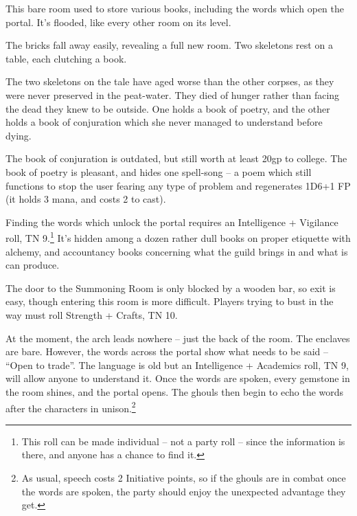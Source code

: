 \begin{multicols}{2}

This bare room used to store various books, including the words which open the portal.  It's flooded, like every other room on its level.

\begin{boxtext}

	The bricks fall away easily, revealing a full new room.  Two skeletons rest on a table, each clutching a book.

\end{boxtext}

The two skeletons on the tale have aged worse than the other corpses, as they were never preserved in the peat-water.  They died of hunger rather than facing the dead they knew to be outside.  One holds a book of poetry, and the other holds a book of conjuration which she never managed to understand before dying.

The book of conjuration is outdated, but still worth at least 20gp to \gls{college}.  The book of poetry is pleasant, and hides one spell-song -- a poem which still functions to stop the user fearing any type of problem and regenerates 1D6+1 FP (it holds 3 mana, and costs 2 to cast).

Finding the words which unlock the portal requires an Intelligence + Vigilance roll, TN 9.\footnote{This roll can be made individual -- not a party roll -- since the information is there, and anyone has a chance to find it.}
It's hidden among a dozen rather dull books on proper etiquette with alchemy, and accountancy books concerning what the guild brings in and what is can produce.

The door to the Summoning Room is only blocked by a wooden bar, so exit is easy, though entering this room is more difficult.
Players trying to bust in the way must roll Strength + Crafts, TN 10.


At the moment, the arch leads nowhere  -- just the back of the room.  The enclaves are bare.
However, the words across the portal show what needs to be said -- ``Open to trade''.
The language is old but an Intelligence + Academics roll, TN 9, will allow anyone to understand it.
Once the words are spoken, every gemstone in the room shines, and the portal opens.
The ghouls then begin to echo the words after the characters in unison.\footnote{As usual, speech costs 2 Initiative points, so if the ghouls are in combat once the words are spoken, the party should enjoy the unexpected advantage they get.}


\end{multicols}
